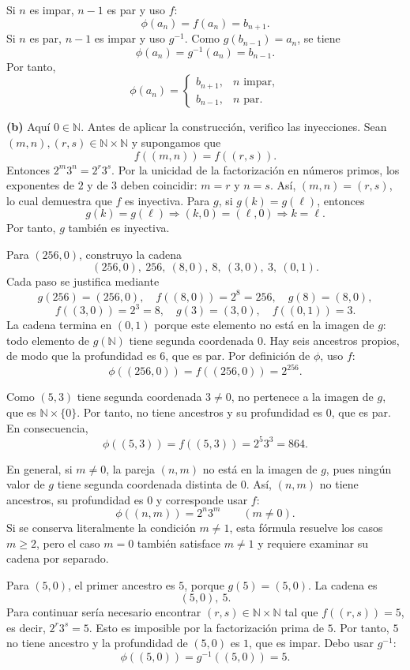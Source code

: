 \documentclass[11pt]{article}
\newcommand{\N}{\mathbb{N}}
\begin{document}
\begin{solution}
Si $n$ es impar, $n-1$ es par y uso $f$:
\[
\phi(a_n)=f(a_n)=b_{n+1}.
\]
Si $n$ es par, $n-1$ es impar y uso $g^{-1}$. Como
$g(b_{n-1})=a_n$, se tiene
\[
\phi(a_n)=g^{-1}(a_n)=b_{n-1}.
\]
Por tanto,
\[
\boxed{
\phi(a_n)=
\begin{cases}
b_{n+1},&n\text{ impar},\\
b_{n-1},&n\text{ par}.
\end{cases}}
\]

\textbf{(b)} Aquí $0\in\N$. Antes de aplicar la construcción, verifico las
inyecciones. Sean $(m,n),(r,s)\in\N\times\N$ y supongamos que
\[
f((m,n))=f((r,s)).
\]
Entonces $2^m3^n=2^r3^s$. Por la unicidad de la factorización en números
primos, los exponentes de $2$ y de $3$ deben coincidir: $m=r$ y $n=s$. Así,
$(m,n)=(r,s)$, lo cual demuestra que $f$ es inyectiva. Para $g$, si
$g(k)=g(\ell)$, entonces
\[
g(k)=g(\ell)\Longrightarrow(k,0)=(\ell,0)\Longrightarrow k=\ell.
\]
Por tanto, $g$ también es inyectiva.

Para $(256,0)$, construyo la cadena
\[
(256,0),\ 256,\ (8,0),\ 8,\ (3,0),\ 3,\ (0,1).
\]
Cada paso se justifica mediante
\[
g(256)=(256,0),\quad f((8,0))=2^8=256,\quad g(8)=(8,0),
\]
\[
f((3,0))=2^3=8,\quad g(3)=(3,0),\quad f((0,1))=3.
\]
La cadena termina en $(0,1)$ porque este elemento no está en la imagen de $g$:
todo elemento de $g(\N)$ tiene segunda coordenada $0$. Hay seis ancestros
propios, de modo que la profundidad es $6$, que es par. Por definición de
$\phi$, uso $f$:
\[
\boxed{\phi((256,0))=f((256,0))=2^{256}}.
\]

Como $(5,3)$ tiene segunda coordenada $3\neq0$, no pertenece a la imagen de
$g$, que es $\N\times\{0\}$. Por tanto, no tiene ancestros y su profundidad es
$0$, que es par. En consecuencia,
\[
\boxed{\phi((5,3))=f((5,3))=2^5 3^3=864}.
\]

En general, si $m\neq0$, la pareja $(n,m)$ no está en la imagen de $g$, pues
ningún valor de $g$ tiene segunda coordenada distinta de $0$. Así, $(n,m)$ no
tiene ancestros, su profundidad es $0$ y corresponde usar $f$:
\[
\boxed{\phi((n,m))=2^n3^m\qquad(m\neq0)}.
\]
Si se conserva literalmente la condición $m\neq1$, esta fórmula resuelve
los casos $m\geq2$, pero el caso $m=0$ también satisface $m\neq1$ y requiere
examinar su cadena por separado.

Para $(5,0)$, el primer ancestro es $5$, porque $g(5)=(5,0)$. La cadena es
\[
(5,0),\ 5.
\]
Para continuar sería necesario encontrar $(r,s)\in\N\times\N$ tal que
$f((r,s))=5$, es decir, $2^r3^s=5$. Esto es imposible por la factorización
prima de $5$. Por tanto, $5$ no tiene ancestro y la profundidad de $(5,0)$ es
$1$, que es impar. Debo usar $g^{-1}$:
\[
\boxed{\phi((5,0))=g^{-1}((5,0))=5}.
\]


\end{solution}
\end{document}
